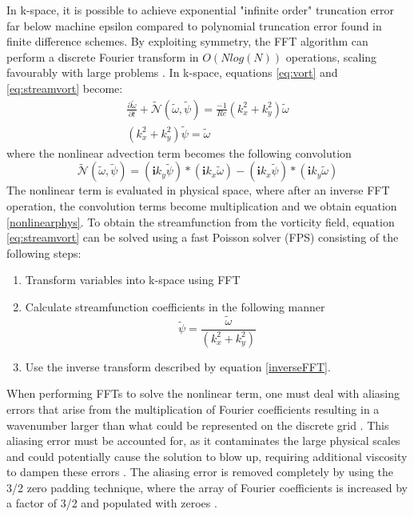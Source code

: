 \documentclass[conf]{new-aiaa}
\begin{document}
In k-space, it is possible to achieve exponential "infinite order" truncation error far below machine epsilon \cite{DNS_Primer} compared to polynomial truncation error found in finite difference schemes. By exploiting symmetry, the FFT algorithm can perform a discrete Fourier transform in $O(Nlog(N))$ operations, scaling favourably with large problems \cite{cooley1965algorithm}. In k-space, equations \eqref{eq:vort} and \eqref{eq:streamvort} become:
\begin{subequations}
    \begin{gather}
        \frac{\partial \tilde{\omega}}{\partial t} + \mathcal{\tilde{N}}(\tilde{\omega},\tilde{\psi})=\frac{-1}{Re}(k_{x}^{2}+k_{y}^{2})\tilde{\omega}   \label{eq:vort_wave}\\ 
        (k_{x}^{2}+k_{y}^{2})\tilde{\psi}=\tilde{\omega} \label{eq:streamvort_wave}
    \end{gather}
\end{subequations}
where the nonlinear advection term becomes the following convolution
\begin{equation}
    \label{nonlinearwave}
    \mathcal{\tilde{N}}(\tilde{\omega},\tilde{\psi}) = (\mathbf{i}k_{y}\tilde{\psi})\ast (\mathbf{i}k_{x}\tilde{\omega})-(\mathbf{i}k_{x}\tilde{\psi})\ast (\mathbf{i}k_{y}\tilde{\omega})
\end{equation}
The nonlinear term is evaluated in physical space, where after an inverse FFT operation, the convolution terms become multiplication and we obtain equation \eqref{nonlinearphys}.
To obtain the streamfunction from the vorticity field, equation \eqref{eq:streamvort} can be solved using a fast Poisson solver (FPS) consisting of the following steps:
\begin{enumerate}
    \item Transform variables into k-space using FFT
    \item Calculate streamfunction coefficients in the following manner
    \begin{equation*}
        \tilde{\psi} = \frac{\tilde{\omega}}{(k_{x}^{2}+k_{y}^{2})}
    \end{equation*}
    \item Use the inverse transform described by equation \eqref{inverseFFT}.
\end{enumerate}
When performing FFTs to solve the nonlinear term, one must deal with aliasing errors that arise from the multiplication of Fourier coefficients resulting in a wavenumber larger than what could be represented on the discrete grid \cite{Orszag_Alias,pope2000turbulent}. This aliasing error must be accounted for, as it contaminates the large physical scales and could potentially cause the solution to blow up, requiring additional viscosity to dampen these errors \cite{Bowman_dealias,Phillips1959}. The aliasing error is removed completely by using the 3/2 zero padding technique, where the array of Fourier coefficients is increased by a factor of 3/2 and populated with zeroes \cite{Python_spectral,Bowman_dealias,Orszag_Alias}.
\end{document}
